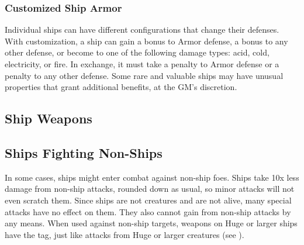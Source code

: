         \subsubsection{Customized Ship Armor}
            Individual ships can have different configurations that change their defenses.
            With customization, a ship can gain a  bonus to Armor defense, a  bonus to any other defense, or become \impervious to one of the following damage types: acid, cold, electricity, or fire.
            In exchange, it must take a  penalty to Armor defense or a  penalty to any other defense.
            Some rare and valuable ships may have unusual properties that grant additional benefits, at the GM's discretion.

    \subsection{Ship Weapons}
        

    \subsection{Ships Fighting Non-Ships}
        In some cases, ships might enter combat against non-ship foes.
        Ships take 10x less damage from non-ship attacks, rounded down as usual, so minor attacks will not even scratch them.
        Since ships are not creatures and are not alive, many special attacks have no effect on them.
        They also cannot gain  from non-ship attacks by any means.
        When used against non-ship targets, weapons on Huge or larger ships have the  tag, just like attacks from Huge or larger creatures (see ).
